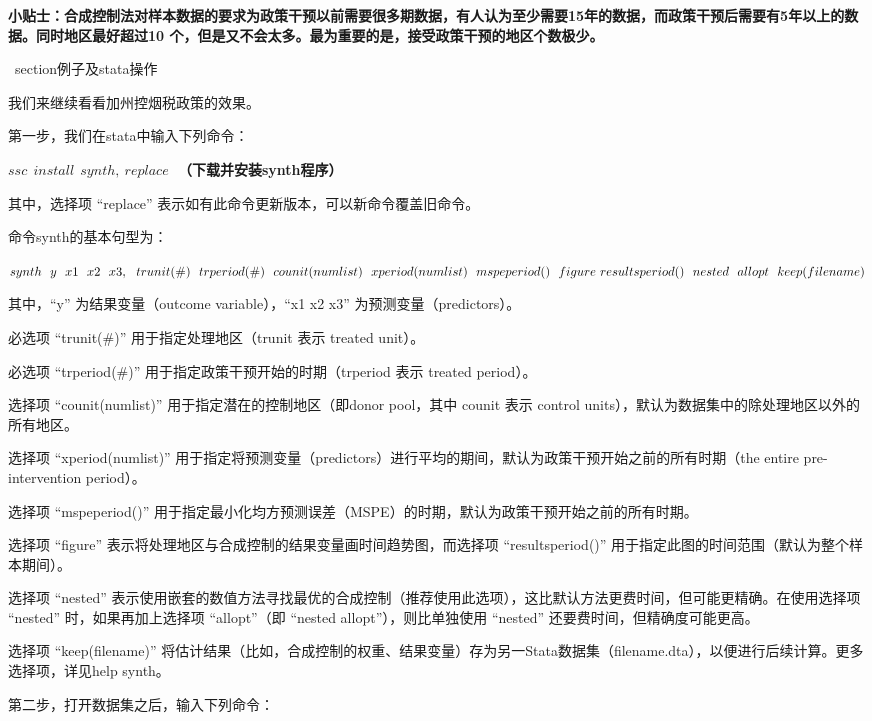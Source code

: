 \documentclass[cn,12pt,math=newtx,citestyle=gb7714-2015,bibstyle=gb7714-2015]{elegantbook}
\begin{document}
	\textbf{小贴士：合成控制法对样本数据的要求为政策干预以前需要很多期数据，有人认为至少需要15年的数据，而政策干预后需要有5年以上的数据。同时地区最好超过10 个，但是又不会太多。最为重要的是，接受政策干预的地区个数极少。}
	
	\
	section{例子及stata操作}
	
	我们来继续看看加州控烟税政策的效果。
	
	第一步，我们在stata中输入下列命令：
	
	\textbf{$ssc~~install~~synth,~replace~~~$（下载并安装synth程序）}
	
	其中，选择项 “replace” 表示如有此命令更新版本，可以新命令覆盖旧命令。
	
	命令synth的基本句型为：
	
	\textbf{$synth~~y~~x1~~x2~~x3 ,~~trunit(\#)~~trperiod(\#)~~counit(numlist)~~xperiod(numlist)~~mspeperiod()~~figure~~\\
		resultsperiod()~~nested~~allopt~~keep(filename)$}
	
	其中，“y” 为结果变量（outcome variable），“x1 x2 x3” 为预测变量（predictors）。
	
	必选项 “trunit(\#)” 用于指定处理地区（trunit 表示 treated unit）。
	
	必选项 “trperiod(\#)” 用于指定政策干预开始的时期（trperiod 表示 treated period）。
	
	选择项 “counit(numlist)” 用于指定潜在的控制地区（即donor pool，其中 counit 表示 control units），默认为数据集中的除处理地区以外的所有地区。
	
	选择项 “xperiod(numlist)” 用于指定将预测变量（predictors）进行平均的期间，默认为政策干预开始之前的所有时期（the entire pre-intervention period）。
	
	选择项 “mspeperiod()” 用于指定最小化均方预测误差（MSPE）的时期，默认为政策干预开始之前的所有时期。
	
	选择项 “figure” 表示将处理地区与合成控制的结果变量画时间趋势图，而选择项 “resultsperiod()” 用于指定此图的时间范围（默认为整个样本期间）。
	
	选择项 “nested” 表示使用嵌套的数值方法寻找最优的合成控制（推荐使用此选项），这比默认方法更费时间，但可能更精确。在使用选择项 “nested” 时，如果再加上选择项 “allopt”（即 “nested allopt”），则比单独使用 “nested” 还要费时间，但精确度可能更高。
	
	选择项 “keep(filename)” 将估计结果（比如，合成控制的权重、结果变量）存为另一Stata数据集（filename.dta），以便进行后续计算。更多选择项，详见help synth。
	
	第二步，打开数据集之后，输入下列命令：
	
\end{document}
